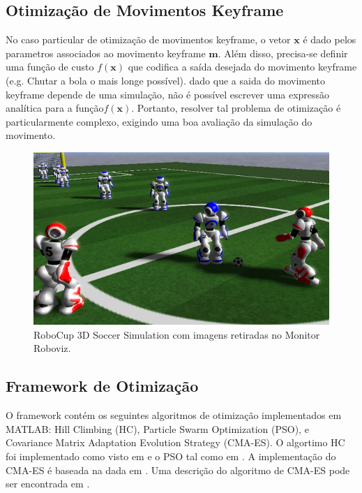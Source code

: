 \documentclass[
10pt, %
a4paper, %
oneside, %
headinclude,footinclude, %
BCOR5mm, %
]{scrartcl}
\begin{document}
\subsection*{Otimização de Movimentos Keyframe}

No caso particular de otimização de movimentos keyframe, o vetor  \( \mathrm{\mathbf{x}} \) é dado pelos parametros associados ao movimento keyframe \( \mathrm{\mathbf{m}} \). Além disso, precisa-se definir uma função de custo  \( f \left( \mathrm{\mathbf{x}} \right) \) que codifica a saída desejada do movimento keyframe (e.g. Chutar a bola o mais longe possível). dado que a saida do movimento keyframe depende de uma simulação, não é possível escrever uma expressão analítica para a função\( f\left( \mathrm{\mathbf{x}} \right) \). Portanto, resolver tal problema de otimização é particularmente complexo, exigindo uma boa avaliação da simulação do movimento. 

\begin{figure}[htb]

\begin{center}
\includegraphics[scale=0.6]{game-screenshot.png}
\end{center}
\caption{\label{fig:simspark}RoboCup 3D Soccer Simulation com imagens retiradas no Monitor Roboviz.}
\end{figure}

\subsection{Framework de Otimização}
		
O framework contém os seguintes algoritmos de otimização implementados em MATLAB: Hill Climbing (HC), Particle Swarm Optimization (PSO), e Covariance Matrix Adaptation Evolution Strategy (CMA-ES). O algortimo HC foi implementado como visto em \cite{Russell:2003:AIM:773294} e o PSO tal como em \cite{Poli2007}. A implementação do CMA-ES é baseada na dada em \cite{cmaimpl}. Uma descrição do algoritmo de CMA-ES pode ser encontrada em \cite{cmatutorial}.
\end{document}
